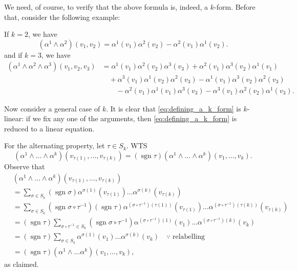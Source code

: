 \documentclass[notoc,notitlepage]{tufte-book}
\DeclareMathOperator{\sgn}{sgn}
\begin{document}
We need, of course, to verify that the above formula is, indeed, a $k$-form.
Before that, consider the following example:

\begin{eg}
  If $k = 2$, we have
  \begin{equation*}
    \left( \alpha^1 \land \alpha^2 \right)(v_1, v_2)
      = \alpha^1(v_1) \alpha^2(v_2) - \alpha^2(v_1) \alpha^1(v_2).
  \end{equation*}
  and if $k = 3$, we have
  \begin{align*}
    \left( \alpha^1 \land \alpha^2 \land \alpha^3 \right)( v_1, v_2, v_3 )
      &= \alpha^1(v_1) \alpha^2(v_2) \alpha^3(v_3) + \alpha^2(v_1) \alpha^3(v_2) \alpha^1(v_1) \\
      &\quad + \alpha^3(v_1) \alpha^1(v_2) \alpha^2(v_3) - \alpha^1(v_1) \alpha^3(v_2) \alpha^2(v_3) \\
      &\qquad - \alpha^2(v_1) \alpha^1(v_1) \alpha^3(v_3) - \alpha^3(v_1) \alpha^2(v_2) \alpha^1(v_3).
  \end{align*}
\end{eg}

Now consider a general case of $k$. It is clear that \cref{eq:defining_a_k_form} is
$k$-linear: if we fix any one of the arguments, then \cref{eq:defining_a_k_form} is
reduced to a linear equation.

For the alternating property, let $\tau \in S_k$. WTS
\begin{equation*}
  \left( \alpha^1 \land \hdots \land \alpha^k \right) \left( v_{\tau(1)}, \ldots, v_{\tau(k)} \right)
    = ( \sgn \tau )\left( \alpha^1 \land \hdots \land \alpha^k \right) \left( v_1, \ldots, v_k \right).
\end{equation*}
Observe that
\begin{align*}
  &\left( \alpha^1 \land \hdots \land \alpha^k \right) \left( v_{\tau(1)}, \ldots, v_{\tau(k)} \right) \\
  &= \sum_{\sigma \in S_k} \left( \sgn \sigma \right)
    \alpha^{\sigma(1)} \left(v_{\tau(1)}\right) \hdots \alpha^{\sigma(k)} \left( v_{\tau(k)} \right) \\
  &= \sum_{\sigma \in S_k} \left( \sgn \sigma \circ \tau^{-1} \right) \left( \sgn \tau \right)
    \alpha^{\left(\sigma \circ \tau^{-1}\right)(\tau(1))} \left(v_{\tau(1)}\right) \hdots
    \alpha^{\left( \sigma \circ \tau^{-1} \right)(\tau(k))} \left( v_{\tau(k)} \right) \\
  &= \left( \sgn \tau \right) \sum_{\sigma \circ \tau^{-1} \in S_k} \left( \sgn \sigma \circ \tau^{-1} \right)
    \alpha^{\left( \sigma \circ \tau^{-1} \right)(1)} (v_1) \hdots
    \alpha^{\left( \sigma \circ \tau^{-1} \right)(k)} (v_k) \\
  &= \left( \sgn \tau \right) \sum_{\sigma \in S_k} \alpha^{\sigma(1)} (v_1) \hdots \alpha^{\sigma(k)} (v_k) \quad \because \text{ relabelling } \\
  &= \left( \sgn \tau \right) \left( \alpha^1 \land \hdots \alpha^k \right) \left( v_1, \ldots, v_k \right),
\end{align*}
as claimed.
\end{document}
